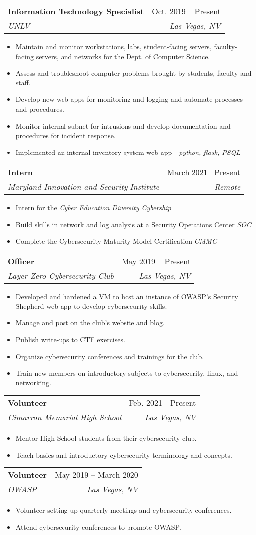 \documentclass[letterpaper,11pt]{article}
\makeatletter
\newcommand{\resumeItem}[1]{
  \item\small{
    {#1 \vspace{-2pt}}
  }
}
\newcommand{\resumeSubheading}[4]{
  \vspace{-2pt}\item
    \begin{tabular*}{0.97\textwidth}[t]{l@{\extracolsep{\fill}}r}
      \textbf{#1} & #2 \\
      \textit{\small#3} & \textit{\small #4} \\
    \end{tabular*}\vspace{-7pt}
}
\newcommand{\resumeItemListStart}{\begin{itemize}}
\newcommand{\resumeItemListEnd}{\end{itemize}\vspace{-5pt}}
\makeatother
\begin{document}
    \resumeSubheading
      {Information Technology Specialist}{Oct. 2019 -- Present}
      {UNLV}{Las Vegas, NV}
      \resumeItemListStart
        \resumeItem{Maintain and monitor workstations, labs, student-facing servers, faculty-facing servers, and networks for the Dept. of Computer Science.}
        \resumeItem{Assess and troubleshoot computer problems brought by students, faculty and staff.}
        \resumeItem{Develop new web-apps for monitoring and logging and automate processes and procedures.}
        \resumeItem{Monitor internal subnet for intrusions and develop documentation and procedures for incident response.}
        \resumeItem{Implemented an internal inventory system web-app - \emph{python, flask, PSQL}}
    \resumeItemListEnd

    \resumeSubheading
      {Intern}{March 2021-- Present}
      {Maryland Innovation and Security Institute}{Remote}
      \resumeItemListStart
        \resumeItem{Intern for the \emph{Cyber Education Diversity Cybership}}
        \resumeItem{Build skills in network and log analysis at a Security Operations Center \emph{SOC}}
        \resumeItem{Complete the Cybersecurity Maturity Model Certification \emph{CMMC}}
      \resumeItemListEnd
      
    \resumeSubheading
      {Officer}{May 2019 -- Present}
      {Layer Zero Cybersecurity Club}{Las Vegas, NV}
      \resumeItemListStart
        \resumeItem{Developed and hardened a VM to host an instance of OWASP's Security Shepherd web-app to develop cybersecurity skills.}
        \resumeItem{Manage and post on the club's website and blog.}
        \resumeItem{Publish write-ups to CTF exercises.}
        \resumeItem{Organize cybersecurity conferences and trainings for the club.}
        \resumeItem{Train new members on introductory subjects to cybersecurity, linux, and networking.}
      \resumeItemListEnd
      
    \resumeSubheading
      {Volunteer}{Feb. 2021 - Present}
      {Cimarron Memorial High School}{Las Vegas, NV}
      \resumeItemListStart
        \resumeItem{Mentor High School students from their cybersecurity club.}
        \resumeItem{Teach basics and introductory cybersecurity terminology and concepts.}
      \resumeItemListEnd

    \resumeSubheading
      {Volunteer}{May 2019 -- March 2020}
      {OWASP}{Las Vegas, NV}
      \resumeItemListStart
        \resumeItem{Volunteer setting up quarterly meetings and cybersecurity conferences.}
        \resumeItem{Attend cybersecurity conferences to promote OWASP.}
      \resumeItemListEnd
      
\end{document}
